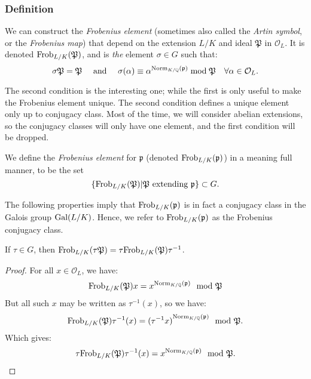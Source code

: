 \subsubsection{Definition}
We can construct the \textit{Frobenius element} (sometimes also called the \textit{Artin symbol}, or the \textit{Frobenius map}) that depend on the extension $L/K$ and ideal $\mathfrak{P}$ in $\mathcal{O}_L$.
It is denoted $\Frob{L/K}{\mathfrak{P}}$, and is \textit{the} element $\sigma \in G$ such that:
$$
\sigma \mathfrak{P} = \mathfrak{P}
\quad \text{ and } \quad
\sigma(\alpha) \equiv \alpha^{\Norm[K/\Q]{\mathfrak{p}}} \bmod{\mathfrak{P}} \quad \forall \alpha \in \mathcal{O}_L.
$$

The second condition is the interesting one; while the first is only useful to make the Frobenius element unique.
The second condition defines a unique element only up to conjugacy class.
Most of the time, we will consider abelian extensions, so the conjugacy classes will only have one element, and the first condition will be dropped.

We define the \textit{Frobenius element} for $\mathfrak{p}$ (denoted $\Frob{L/K}{\mathfrak{p}}$) in a meaning full manner, to be the set
$$
\{\Frob{L/K}{\mathfrak{P}} | \mathfrak{P} \text{ extending } \mathfrak{p}\} \subset G
.$$

The following properties imply that $\Frob{L/K}{\mathfrak{p}}$ is in fact a conjugacy class in the Galois group $\Gal{L/K}$.
Hence, we refer to $\Frob{L/K}{\mathfrak{p}}$ as the Frobenius conjugacy class.

\begin{property}
	If $\tau \in G$, then 
	$\Frob{L/K}{\mathfrak{\tau P}} = \tau \Frob{L/K}{\mathfrak{P}} \tau^{-1}$.
\end{property}
\begin{proof}
	For all $x \in \mathcal{O}_L$, we have:
	$$
	\Frob{L/K}{\mathfrak{P}}x 
	= x^{\Norm[K/\Q]{\mathfrak{p}}} \mod \mathfrak{P}
	$$
	But all such $x$ may be written as $\tau^{-1}(x)$, so we have:
	$$
	\Frob{L/K}{\mathfrak{P}} \tau^{-1}(x) 
	= {(\tau^{-1} x)}^{\Norm[K/\Q]{\mathfrak{p}}} \mod \mathfrak{P}.
	$$
	Which gives:
	$$
	\tau \Frob{L/K}{\mathfrak{P}}\tau^{-1}(x) 
	= x^{\Norm[K/\Q]{\mathfrak{p}}} \mod \mathfrak{P}.
	$$
\end{proof}


